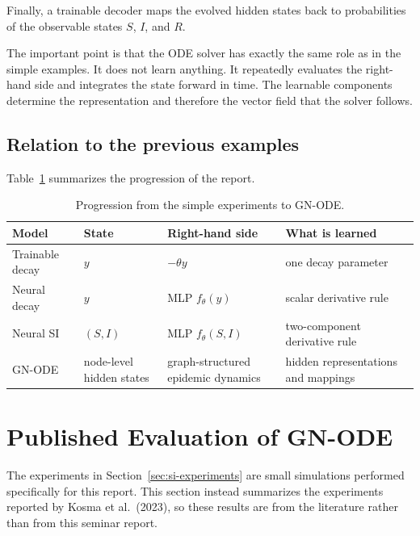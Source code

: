 \documentclass[11pt,a4paper]{article}
\begin{document}
Finally, a trainable decoder maps the evolved hidden states back to
probabilities of the observable states $S$, $I$, and $R$.

The important point is that the ODE solver has exactly the same role as in the
simple examples. It does not learn anything. It repeatedly evaluates the
right-hand side and integrates the state forward in time. The learnable
components determine the representation and therefore the vector field that
the solver follows.


\subsection{Relation to the previous examples}

Table~\ref{tab:progression} summarizes the progression of the report.

\begin{table}[h]
\centering
\small
\begin{tabularx}{\textwidth}{lXXX}
\toprule
Model & State & Right-hand side & What is learned\\
\midrule

Trainable decay
&
$y$
&
$-\theta y$
&
one decay parameter
\\

Neural decay
&
$y$
&
MLP $f_\theta(y)$
&
scalar derivative rule
\\

Neural SI
&
$(S,I)$
&
MLP $f_\theta(S,I)$
&
two-component derivative rule
\\

GN-ODE
&
node-level hidden states
&
graph-structured epidemic dynamics
&
hidden representations and mappings
\\

\bottomrule
\end{tabularx}
\caption{Progression from the simple experiments to GN-ODE.}
\label{tab:progression}
\end{table}


\section{Published Evaluation of GN-ODE}
\label{sec:published-results}

The experiments in Section~\ref{sec:si-experiments} are small simulations
performed specifically for this report. This section instead summarizes the
experiments reported by Kosma et al.\ (2023), so these results are from the
literature rather than from this seminar report.
\end{document}
